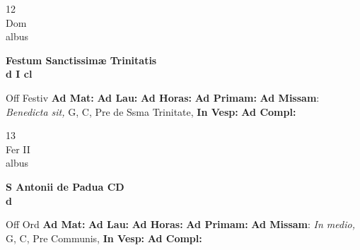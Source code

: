\documentclass[10pt, openany]{book}
\begin{document}
    \begin{center}
        \begin{minipage}{3.5in}
            \vspace{2em}
            \begin{minipage}{0.5in}
                {\Huge 12} \\
                {\normalsize Dom} \\
                {\normalsize albus}
            \end{minipage}
            \begin{minipage}{3.0in}
                \textbf{ \large Festum Sanctissimæ Trinitatis \\
                \textnormal{\normalsize d I cl}} \\ 
            \end{minipage}
            \begin{justify}Off Festiv
                \textbf{Ad Mat: }
                \textbf{Ad Lau: }
                \textbf{Ad Horas: }
                \textbf{Ad Primam: }\textbf{Ad Missam}: \textit{Benedicta sit,} G, C, Pre de Ssma Trinitate,  
                \textbf{In Vesp: }
                \textbf{Ad Compl: }
            \end{justify}
        \end{minipage}
    \end{center}

    \begin{center}
        \begin{minipage}{3.5in}
            \vspace{2em}
            \begin{minipage}{0.5in}
                {\Huge 13} \\
                {\normalsize Fer II} \\
                {\normalsize albus}
            \end{minipage}
            \begin{minipage}{3.0in}
                \textbf{ \large S Antonii de Padua CD \\
                \textnormal{\normalsize d}} \\ 
            \end{minipage}
            \begin{justify}Off Ord
                \textbf{Ad Mat: }
                \textbf{Ad Lau: }
                \textbf{Ad Horas: }
                \textbf{Ad Primam: }\textbf{Ad Missam}: \textit{In medio,} G, C, Pre Communis,  
                \textbf{In Vesp: }
                \textbf{Ad Compl: }
            \end{justify}
        \end{minipage}
    \end{center}
\end{document}
